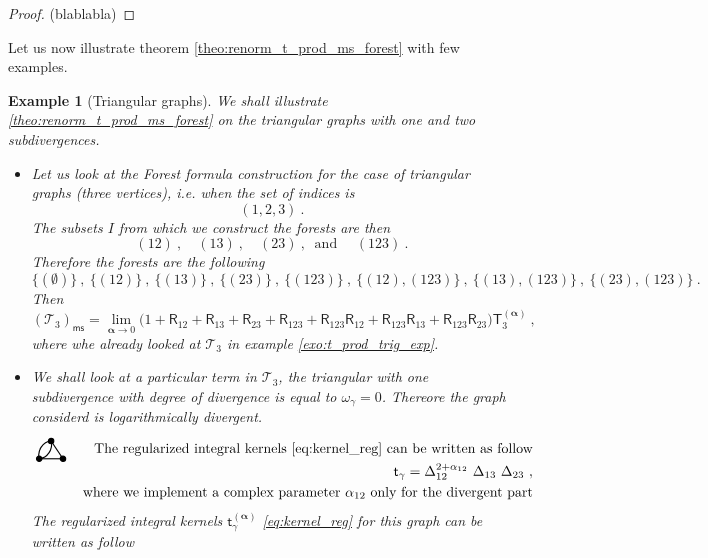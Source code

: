 \documentclass[11pt]{book}
\newcommand{\hilight}[1]{\colorbox{yellow!80!black}{#1}}
\newcommand{\ms}{\mathsf{ms}}
\newcommand{\alphabd}{\boldsymbol{\alpha}}
\newcommand{\Tcal}{\mathcal{T}}
\newcommand{\Rsf}{\mathsf{R}}
\newcommand{\Tsf}{\mathsf{T}}
\newcommand{\tsf}{\mathsf{t}}
\theoremstyle{break}
\newtheorem{example}{Example}[chapter]
\newcommand{\FtwoGoneHoneF}{\begin{tikzpicture}[thick,scale=1.5]
\useasboundingbox (-0.1,0.1) rectangle (0.5,0.4);
\filldraw (0,0) circle (1.3pt);
\filldraw (0.4,0) circle (1.3pt);
\filldraw (0.2,0.3) circle (1.3pt);
\draw (0,0) edge [out=105,in=185] node[above] {} (0.2,0.3);
\draw (0,0) edge [out=5,in=-75] node[above] {} (0.2,0.3);
\draw (0.4,0) -- (0.2,0.3);
\draw (0.4,0) -- (0,0);
\end{tikzpicture} }
\begin{document}
\begin{proof}
\hilight{(blablabla)}
\end{proof}


Let us now illustrate theorem \ref{theo:renorm_t_prod_ms_forest} with few examples.


\begin{example}[Triangular graphs]\label{exo:trig_graph}
We shall illustrate \ref{theo:renorm_t_prod_ms_forest} on the triangular graphs with one and two subdivergences.
%
\begin{itemize}
\item Let us look at the Forest formula construction for the case of triangular graphs (three vertices), i.e. when the set of indices is 
%
\begin{equation*}
(1,2,3) \ . 
\end{equation*}
%
The subsets $I$ from which we construct the forests are then
%
\begin{equation*}
(12) \ , \quad (13) \ , \quad (23) \ , \ \mbox{ and } \quad (123) \ .
\end{equation*}
%
Therefore the forests are the following 
%
\begin{equation*}
\{(\emptyset)\} \ , \
\{(12)\} \ , \
\{(13)\} \ , \
\{(23)\} \ , \
\{(123)\} \ , \
\{(12),(123)\} \ , \
\{(13),(123)\} \ , \
\{(23),(123)\} \ .
\end{equation*}
%
Then 
%
\begin{equation*}
(\Tcal_3)_\ms = \lim_{\alphabd \to 0} \bigg( 
1
+ \Rsf_{12}
+ \Rsf_{13}
+ \Rsf_{23}
+ \Rsf_{123}
+ \Rsf_{123} \Rsf_{12}
+ \Rsf_{123} \Rsf_{13}
+ \Rsf_{123} \Rsf_{23}
\bigg) \Tsf^{(\alphabd)}_3 \ ,
\end{equation*}
%
where whe already looked at $\Tcal_3$ in example \ref{exo:t_prod_trig_exp}.
%
%
%
%
\item We shall look at a particular term in $\Tcal_3$, the triangular with one subdivergence with degree of divergence is equal to $\omega_\gamma = 0$. Thereore the graph considerd is logarithmically divergent.
%
\begin{eqnarray*}
\FtwoGoneHoneF 
&& \mbox{The regularized integral kernels \eqref{eq:kernel_reg} can be written as follow} \\
&& \tsf_\gamma = \Delta_{12}^{2+\alpha_{12}} \ \Delta_{13} \ \Delta_{23} \ , \\
&& \mbox{where we implement a complex parameter $\alpha_{12}$ only for the divergent part}
\end{eqnarray*}
%
The regularized integral kernels $\tsf^{(\alphabd)}_\gamma$ \eqref{eq:kernel_reg} for this graph can be written as follow

\end{itemize}
\end{example}
\end{document}
